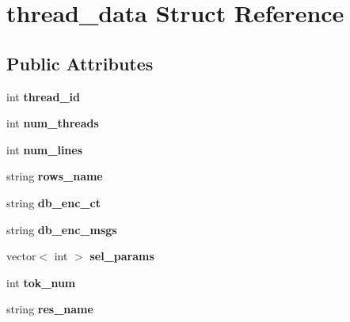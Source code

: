 \hypertarget{structthread__data}{}\section{thread\+\_\+data Struct Reference}
\label{structthread__data}
\subsection*{Public Attributes}
\begin{DoxyCompactItemize}
\item 
int {\bfseries thread\+\_\+id}\hypertarget{structthread__data_a7f99c8728f153827a108b77f60420074}{}\label{structthread__data_a7f99c8728f153827a108b77f60420074}

\item 
int {\bfseries num\+\_\+threads}\hypertarget{structthread__data_ac406249a3baf00e1ff1948e3384e4fd9}{}\label{structthread__data_ac406249a3baf00e1ff1948e3384e4fd9}

\item 
int {\bfseries num\+\_\+lines}\hypertarget{structthread__data_a37189156dac628a7eeb2d407e9e76eb4}{}\label{structthread__data_a37189156dac628a7eeb2d407e9e76eb4}

\item 
string {\bfseries rows\+\_\+name}\hypertarget{structthread__data_a83d6a7aa8fcdeba681435390022af703}{}\label{structthread__data_a83d6a7aa8fcdeba681435390022af703}

\item 
string {\bfseries db\+\_\+enc\+\_\+ct}\hypertarget{structthread__data_ac1995c6d9ca873a4678fda316dbce74b}{}\label{structthread__data_ac1995c6d9ca873a4678fda316dbce74b}

\item 
string {\bfseries db\+\_\+enc\+\_\+msgs}\hypertarget{structthread__data_aeaf49d487ee0d162a590072089e7c413}{}\label{structthread__data_aeaf49d487ee0d162a590072089e7c413}

\item 
vector$<$ int $>$ {\bfseries sel\+\_\+params}\hypertarget{structthread__data_a91e369008a51943546b2f4f3c72bacec}{}\label{structthread__data_a91e369008a51943546b2f4f3c72bacec}

\item 
int {\bfseries tok\+\_\+num}\hypertarget{structthread__data_a273ce0eb07aee8c86730da288284ff57}{}\label{structthread__data_a273ce0eb07aee8c86730da288284ff57}

\item 
string {\bfseries res\+\_\+name}\hypertarget{structthread__data_a2210f39da12da0f53ad37d25a1b6ccb0}{}\label{structthread__data_a2210f39da12da0f53ad37d25a1b6ccb0}


\end{DoxyCompactItemize}
